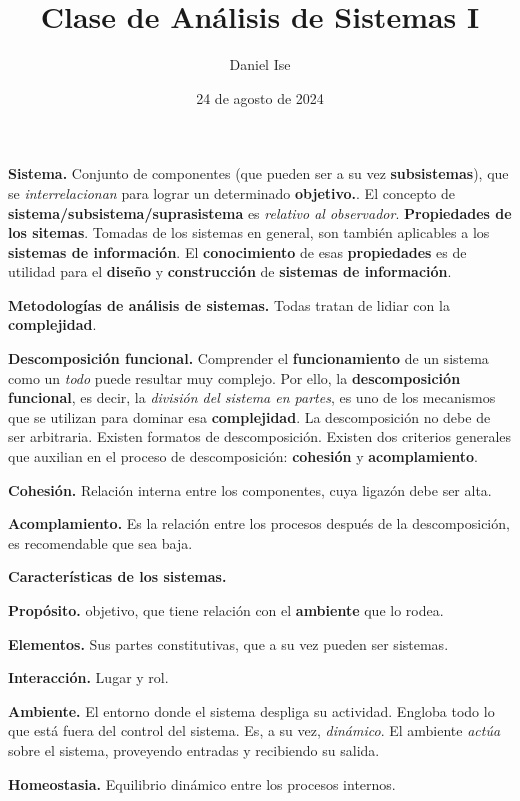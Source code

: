 \documentclass{article}
\title{Clase de Análisis de Sistemas I}
\author{Daniel Ise}
\date{24 de agosto de 2024}
\begin{document}
\maketitle

\textbf{Sistema.} Conjunto de componentes (que pueden ser a su vez
\textbf{subsistemas}), que se \textit{interrelacionan} para lograr un
determinado \textbf{objetivo.}.
El concepto de \textbf{sistema/subsistema/suprasistema} es
\textit{relativo al observador}.
\textbf{Propiedades de los sitemas}. Tomadas de los sistemas en general, son
también aplicables a los \textbf{sistemas de información}. El
\textbf{conocimiento} de esas \textbf{propiedades} es de utilidad para el
\textbf{diseño} y \textbf{construcción} de \textbf{sistemas de información}.

\textbf{Metodologías de análisis de sistemas.} Todas tratan de lidiar con la
\textbf{complejidad}.

\textbf{Descomposición funcional.} Comprender el \textbf{funcionamiento} de un
sistema como un \textit{todo} puede resultar muy complejo. Por ello, la
\textbf{descomposición funcional}, es decir, la
\textit{división del sistema en partes}, es uno de los mecanismos que se
utilizan para dominar esa \textbf{complejidad}. La descomposición no debe de ser
arbitraria. Existen formatos de descomposición. Existen dos criterios generales
que auxilian en el proceso de descomposición: \textbf{cohesión} y
\textbf{acomplamiento}.

\textbf{Cohesión.} Relación interna entre los componentes, cuya ligazón debe ser
alta.

\textbf{Acomplamiento.} Es la relación entre los procesos después de la
descomposición, es recomendable que sea baja.

\textbf{Características de los sistemas.}

\textbf{Propósito.} objetivo, que tiene relación con el \textbf{ambiente} que lo
rodea.

\textbf{Elementos.} Sus partes constitutivas, que a su vez pueden ser sistemas.

\textbf{Interacción.} Lugar y rol.

\textbf{Ambiente.} El entorno donde el sistema despliga su actividad. Engloba
todo lo que está fuera del control del sistema. Es, a su vez, \textit{dinámico}.
El ambiente \textit{actúa} sobre el sistema, proveyendo entradas y recibiendo su
salida.

\textbf{Homeostasia.} Equilibrio dinámico entre los procesos internos.
\end{document}
